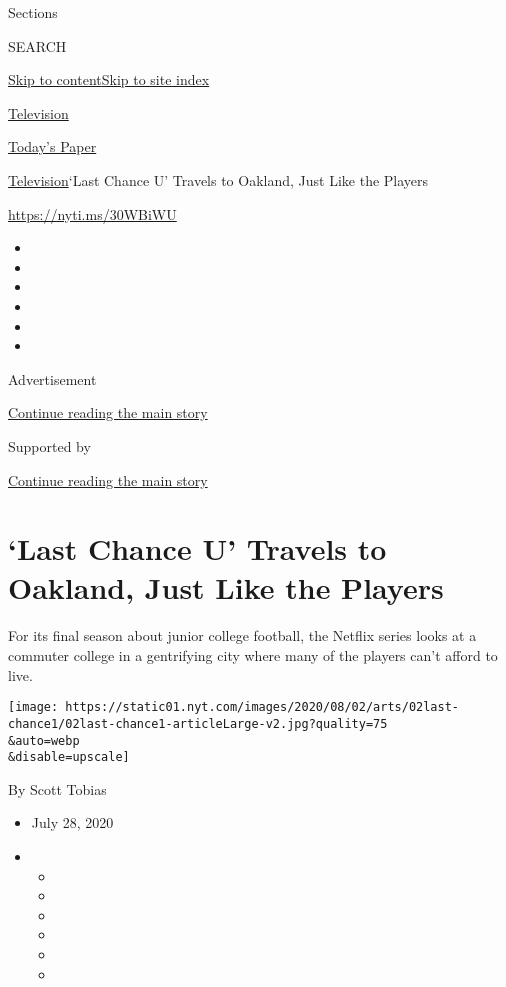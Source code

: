 Sections

SEARCH

\protect\hyperlink{site-content}{Skip to
content}\protect\hyperlink{site-index}{Skip to site index}

\href{https://www.nytimes.com/section/arts/television}{Television}

\href{https://myaccount.nytimes.com/auth/login?response_type=cookie\&client_id=vi}{}

\href{https://www.nytimes.com/section/todayspaper}{Today's Paper}

\href{/section/arts/television}{Television}\textbar{}`Last Chance U'
Travels to Oakland, Just Like the Players

\url{https://nyti.ms/30WBiWU}

\begin{itemize}
\item
\item
\item
\item
\item
\item
\end{itemize}

Advertisement

\protect\hyperlink{after-top}{Continue reading the main story}

Supported by

\protect\hyperlink{after-sponsor}{Continue reading the main story}

\hypertarget{last-chance-u-travels-to-oakland-just-like-the-players}{%
\section{`Last Chance U' Travels to Oakland, Just Like the
Players}\label{last-chance-u-travels-to-oakland-just-like-the-players}}

For its final season about junior college football, the Netflix series
looks at a commuter college in a gentrifying city where many of the
players can't afford to live.

\texttt{[image: https://static01.nyt.com/images/2020/08/02/arts/02last-chance1/02last-chance1-articleLarge-v2.jpg?quality=75\\\&auto=webp\\\&disable=upscale]}

By Scott Tobias

\begin{itemize}
\item
  July 28, 2020
\item
  \begin{itemize}
  \item
  \item
  \item
  \item
  \item
  \item
  \end{itemize}
\end{itemize}

